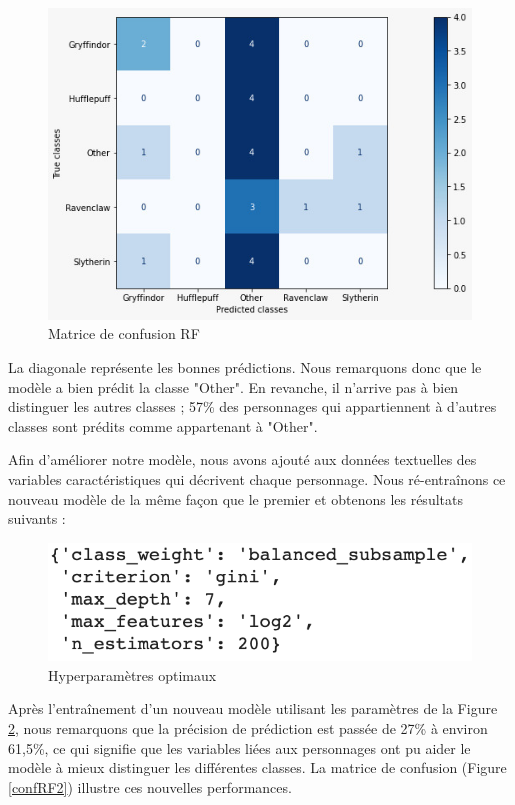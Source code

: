 \documentclass[11pt]{article}
\begin{document}
\begin{center}
\begin{figure}[hbt!]
    \centering
    \includegraphics[width= 11 cm]{figures/matriceconfRF.jpeg}
    \caption{Matrice de confusion RF}
    \label{confRF}
\end{figure}
\FloatBarrier

La diagonale représente les bonnes prédictions. Nous remarquons donc que le modèle a bien prédit la classe "Other". En revanche, il n'arrive pas à bien distinguer les autres classes ; 57\% des personnages qui appartiennent à d'autres classes sont prédits comme appartenant à "Other".\par

Afin d’améliorer notre modèle, nous avons ajouté aux données textuelles des variables caractéristiques qui décrivent chaque personnage. Nous ré-entraînons ce nouveau modèle de la même façon que le premier et obtenons les résultats suivants :

\begin{figure}[hbt!]
    \centering
    \includegraphics[width= 9 cm]{figures/outputCVRF2.png}
    \caption{Hyperparamètres optimaux}
    \label{CV2}
\end{figure}
\FloatBarrier

Après l’entraînement d'un nouveau modèle utilisant les paramètres de la Figure \ref{CV2}, nous remarquons que la précision de prédiction est passée de 27\% à environ 61,5\%, ce qui signifie que les variables liées aux personnages ont pu aider le modèle à mieux distinguer les différentes classes.
La matrice de confusion (Figure \ref{confRF2}) illustre ces nouvelles performances.


\end{center}
\end{document}
